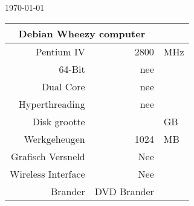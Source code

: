 \documentclass[a4paper,14pt]{extarticle}
\begin{document}
\centerline{\today}
\vskip 0.5cm
\begin{center}
\begin{tabular}{ |r| r| l| }
	\multicolumn{2}{c}{\Huge{Debian Wheezy computer}}\\
	\hline
	Pentium IV & 2800 & MHz \\
	64-Bit & nee & \\
	Dual Core & nee & \\
	Hyperthreading & nee & \\
	Disk grootte & \disksize{} & GB \\
	Werkgeheugen & 1024 & MB \\
	Grafisch Versneld & Nee & \\
	Wireless Interface & Nee & \\
	Brander & DVD Brander & \\
\end{tabular}
\end{center}
\end{document}
